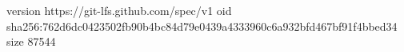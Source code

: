 version https://git-lfs.github.com/spec/v1
oid sha256:762d6dc0423502fb90b4bc84d79e0439a4333960c6a932bfd467bf91f4bbed34
size 87544
